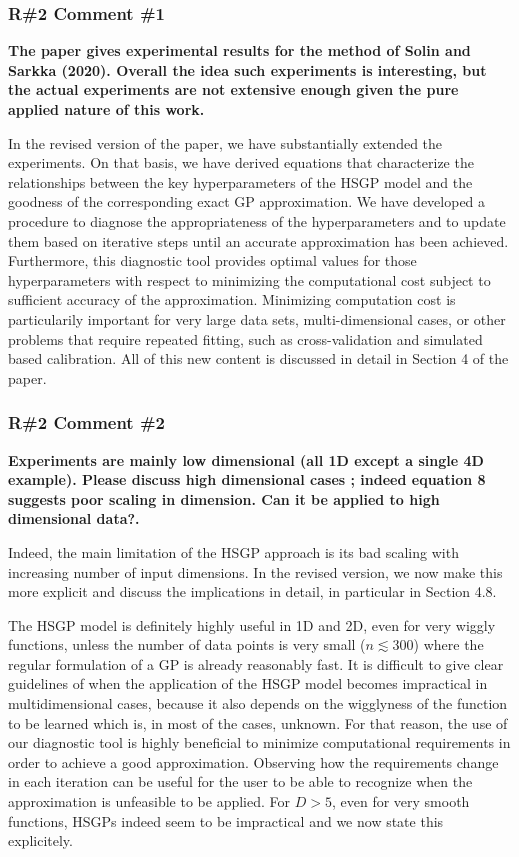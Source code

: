 \documentclass[11pt]{report}
\begin{document}
\subsubsection*{R\#2 Comment \#1}

\textbf{The paper gives experimental results for the method of Solin and Sarkka  (2020). Overall the idea such experiments is interesting, but the actual experiments are not extensive enough given the pure applied nature of this work.}

In the revised version of the paper, we have substantially extended the experiments. On that basis, we have derived equations that characterize the relationships between the key hyperparameters of the HSGP model and  the goodness of the corresponding exact GP approximation. We have developed a procedure to diagnose the appropriateness of the hyperparameters and to update them based on iterative steps until an accurate approximation has been achieved. Furthermore, this diagnostic tool provides optimal values for those hyperparameters with respect to minimizing the computational cost subject to sufficient accuracy of the approximation. Minimizing computation cost is particularily important for very large data sets, multi-dimensional cases, or other problems that require repeated fitting, such as cross-validation and simulated based calibration. All of this new content is discussed in detail in Section 4 of the paper.


\subsubsection*{R\#2 Comment \#2}

\textbf{Experiments are mainly low dimensional (all 1D except a single 4D example). Please discuss high dimensional cases ; indeed equation 8 suggests poor scaling in dimension. Can it be applied to high dimensional data?.} 

Indeed, the main limitation of the HSGP approach is its bad scaling with increasing number of input dimensions. In the revised version, we now make this more explicit and discuss the implications in detail, in particular in Section 4.8.

The HSGP model is definitely highly useful in 1D and 2D, even for very wiggly functions, unless the number of data points is very small ($n \lesssim 300$) where the regular formulation of a GP is already reasonably fast. It is difficult to give clear guidelines of when the application of the HSGP model becomes impractical in multidimensional cases, because it also depends on the wigglyness of the function to be learned which is, in most of the cases, unknown. For that reason, the use of our diagnostic tool is highly beneficial to minimize computational requirements in order to achieve a good approximation. Observing how the requirements change in each iteration can be useful for the user to be able to recognize when the approximation is unfeasible to be applied. For $D>5$, even for very smooth functions, HSGPs indeed seem to be impractical and we now state this explicitely.
\end{document}
